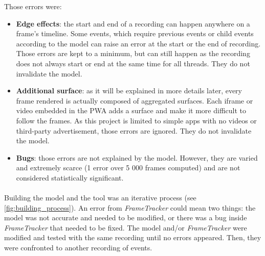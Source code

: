 \documentclass{kththesis}
\begin{document}
    Those errors were:
    \begin{itemize}
        \item \textbf{Edge effects}: the start and end of a recording can happen anywhere on a frame's timeline. Some events, which require previous events or child events according to the model can raise an error at the start or the end of recording. Those errors are kept to a minimum, but can still happen as the recording does not always start or end at the same time for all threads. They do not invalidate the model.
        \item \textbf{Additional surface}: as it will be explained in more details later, every frame rendered is actually composed of aggregated surfaces. Each iframe or video embedded in the PWA adds a surface and make it more difficult to follow the frames. As this project is limited to simple apps with no videos or third-party advertisement, those errors are ignored. They do not invalidate the model.
        \item \textbf{Bugs}: those errors are not explained by the model. However, they are varied and extremely scarce (1 error over 5 000 frames computed) and are not considered statistically significant.
    \end{itemize}
    
    
    




\paragraph{}
Building the model and the tool was an iterative process (see \autoref{fig:building_process}). An error from \textit{FrameTracker} could mean two things: the model was not accurate and needed to be modified, or there was a bug inside \textit{FrameTracker} that needed to be fixed. The model and/or \textit{FrameTracker} were modified and tested with the same recording until no errors appeared. Then, they were confronted to another recording of events.  
\end{document}
